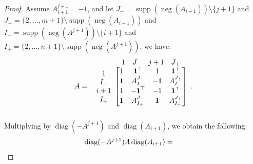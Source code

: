 \documentclass[11pt,a4paper]{amsart}
\theoremstyle{plain}
\theoremstyle{definition}
\DeclareMathOperator{\supp}{supp}
\DeclareMathOperator{\diag}{diag}
\DeclareMathOperator{\nega}{neg}
\begin{document}
\begin{proof}
Assume $A_{i+1}^{j+1}=-1$, and let $J_{-} = \supp(\nega(A_{i+1}))\setminus\{j+1\}$ and $J_{+} = \{2,\ldots,m+1\}\setminus \supp(\nega(A_{i+1}))$ and 
$I_{-} = \supp(\nega(A^{j+1}))\setminus\{i+1\}$ and $I_{+} = \{2,\ldots,n+1\}\setminus \supp(\nega(A^{j+1}))$, we have:
$$A = \begin{array}{c@{}c}
& \begin{array}{cccc}
	1 & J_-& j+1 & J_+
\end{array}\\
\begin{array}{c}
	1\\I_- \\ i+1 \\ I_+
\end{array} &\begin{bmatrix}
	1 & \mathbf{1}^\top & 1 & \mathbf{1}^\top \\
	\mathbf{1} & A_{I_-}^{J_-} & \mathbf{-1} & A_{I_-}^{J_+}\\
	1& \mathbf{-1}^\top &-1&\mathbf{1}^\top\\ 
	\mathbf{1}& A_{I_+}^{J_-} & \mathbf{1} & A_{I_+}^{J_+}
\end{bmatrix}\\&\end{array}.$$
	Multiplying by $\diag(-A^{j+1})$ and $\diag(A_{i+1})$, we obtain the following:
	$$\diag(-A^{j+1})A\diag(A_{i+1}) = \begin{array}{c@{}c}
& \begin{array}{cccc}

\end{array}
\end{array}$$
\end{proof}
\end{document}
